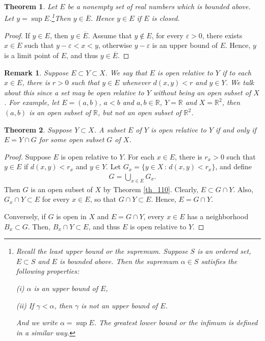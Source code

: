 \documentclass[10pt]{book}
\newtheorem{theorem}{Theorem}[chapter]
\newtheorem{remark}{Remark}[chapter]
\theoremstyle{definition}
\numberwithin{equation}{chapter}
\begin{document}
\begin{theorem}\label{th_113}
Let $E$ be a nonempty set of real numbers which is bounded above. Let $y = \sup E$.\footnote{Recall the {\em least upper bound} or the {\em supremum}. Suppose $S$ is an ordered set, $E \subset S$ and $E$ is bounded above. Then the supremum $\alpha \in S$ satisfies the following properties: \begin{enumerate*}
    \item[(i)] $\alpha$ is an upper bound of $E$,
    \item[(ii)] If $\gamma < \alpha$, then $\gamma$ is not an upper bound of $E$.
\end{enumerate*} And we write $\alpha = \sup E$. The {\em greatest lower bound} or the {\em infimum} is defined in a similar way.}Then $y \in \overline{E}$. Hence $y \in E$ if $E$ is closed.
\end{theorem}
\begin{proof}
If $y \in E$, then $y \in \overline{E}$. Assume that $y \notin E$, for every $\varepsilon > 0$, there exists $x \in E$ such that $y - \varepsilon < x < y$, otherwise $y - \varepsilon$ is an upper bound of $E$. Hence, $y$ is a limit point of $E$, and thus $y \in \overline{E}$.
\end{proof}

\begin{remark}
Suppose $E \subset Y \subset X$. We say that $E$ is {\em open relative} to $Y$ if to each $x \in E$, there is $r > 0$ such that $y \in E$ whenever $d(x,y) < r$ and $y \in Y$. We talk about this since a set may be open relative to $Y$ without being an open subset of $X$. For example, let $E = (a,b)$, $a < b$ and $a,b \in \mathbb{R}$, $Y = \mathbb{R}$ and $X = \mathbb{R}^2$, then $(a,b)$ is an open subset of $\mathbb{R}$, but not an open subset of $\mathbb{R}^2$.
\end{remark}

\medskip

\begin{theorem}
Suppose $Y \subset X$. A subset $E$ of $Y$ is open relative to $Y$ if and only if $E = Y \cap G$ for some open subset $G$ of $X$.
\end{theorem}
\begin{proof}
Suppose $E$ is open relative to $Y$. For each $x \in E$, there is $r_x > 0$ such that $y \in E$ if $d(x,y) < r_x$ and $y \in Y$. Let $G_x = \{y \in X \,:\, d(x,y) < r_x\}$, and define
\begin{align*}
    G = \bigcup_{x \in E} G_x.
\end{align*}
Then $G$ is an open subset of $X$ by Theorem \ref{th_110}. Clearly, $E \subset G \cap Y$. Also, $G_x \cap Y \subset E$ for every $x \in E$, so that $G \cap Y \subset E$. Hence, $E = G \cap Y$. 

Conversely, if $G$ is open in $X$ and $E = G \cap Y$, every $x \in E$ has a neighborhood $B_x \subset G$. Then, $B_x \cap Y \subset E$, and thus $E$ is open relative to $Y$.
\end{proof}
\end{document}
